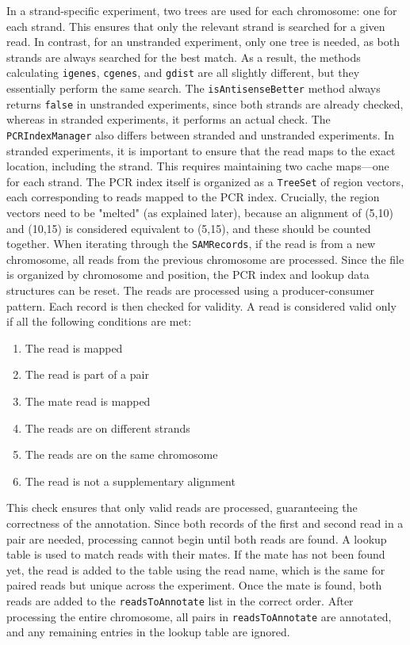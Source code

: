 \documentclass{article}
\begin{document}
    In a strand-specific experiment, two trees are used for each chromosome: one for each strand. This ensures that only the relevant strand is searched for a given read. In contrast, for an unstranded experiment, only one tree is needed, as both strands are always searched for the best match. As a result, the methods calculating \texttt{igenes}, \texttt{cgenes}, and \texttt{gdist} are all slightly different, but they essentially perform the same search. The \texttt{isAntisenseBetter} method always returns \texttt{false} in unstranded experiments, since both strands are already checked, whereas in stranded experiments, it performs an actual check. The \texttt{PCRIndexManager} also differs between stranded and unstranded experiments. In stranded experiments, it is important to ensure that the read maps to the exact location, including the strand. This requires maintaining two cache maps—one for each strand. The PCR index itself is organized as a \texttt{TreeSet} of region vectors, each corresponding to reads mapped to the PCR index. Crucially, the region vectors need to be "melted" (as explained later), because an alignment of (5,10) and (10,15) is considered equivalent to (5,15), and these should be counted together. When iterating through the \texttt{SAMRecords}, if the read is from a new chromosome, all reads from the previous chromosome are processed. Since the file is organized by chromosome and position, the PCR index and lookup data structures can be reset. The reads are processed using a producer-consumer pattern. Each record is then checked for validity. A read is considered valid only if all the following conditions are met:


    \begin{enumerate}
        \item The read is mapped
        \item The read is part of a pair
        \item The mate read is mapped
        \item The reads are on different strands
        \item The reads are on the same chromosome
        \item The read is not a supplementary alignment
    \end{enumerate}
    This check ensures that only valid reads are processed, guaranteeing the correctness of the annotation. Since both records of the first and second read in a pair are needed, processing cannot begin until both reads are found. A lookup table is used to match reads with their mates. If the mate has not been found yet, the read is added to the table using the read name, which is the same for paired reads but unique across the experiment. Once the mate is found, both reads are added to the \texttt{readsToAnnotate} list in the correct order. After processing the entire chromosome, all pairs in \texttt{readsToAnnotate} are annotated, and any remaining entries in the lookup table are ignored.
\end{document}
